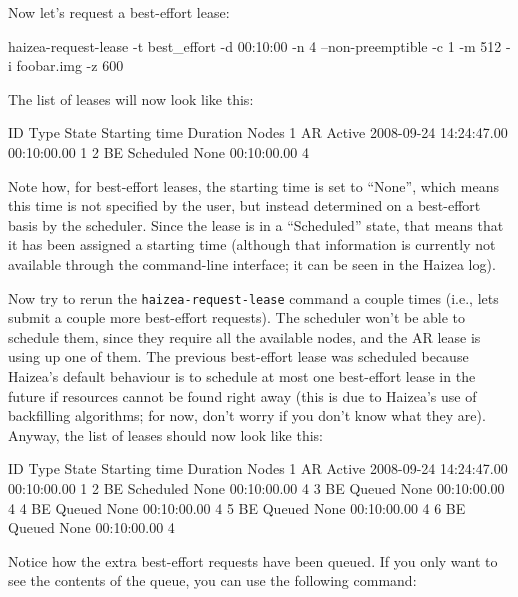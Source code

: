 Now let's request a best-effort lease:

\begin{wideshellverbatim}
haizea-request-lease -t best_effort -d 00:10:00 -n 4 --non-preemptible -c 1 -m 512 -i foobar.img -z 600
\end{wideshellverbatim}

The list of leases will now look like this:

\begin{wideshellverbatim}
 ID   Type  State      Starting time           Duration      Nodes  
 1    AR    Active     2008-09-24 14:24:47.00  00:10:00.00   1       
 2    BE    Scheduled  None                    00:10:00.00   4       
\end{wideshellverbatim}

Note how, for best-effort leases, the starting time is set to ``None'', which means this time is not specified by the user, but instead determined on a best-effort basis by the scheduler. Since the lease is in a ``Scheduled'' state, that means that it has been assigned a starting time (although that information is currently not available through the command-line interface; it can be seen in the Haizea log).

Now try to rerun the \texttt{haizea-request-lease} command a couple times (i.e., lets submit a couple more best-effort requests). The scheduler won't be able to schedule them, since they require all the available nodes, and the AR lease is using up one of them. The previous best-effort lease was scheduled because Haizea's default behaviour is to schedule at most one best-effort lease in the future if resources cannot be found right away (this is due to Haizea's use of backfilling algorithms; for now, don't worry if you don't know what they are). Anyway, the list of leases should now look like this:

\begin{wideshellverbatim}
 ID   Type  State      Starting time           Duration      Nodes  
 1    AR    Active     2008-09-24 14:24:47.00  00:10:00.00   1       
 2    BE    Scheduled  None                    00:10:00.00   4       
 3    BE    Queued     None                    00:10:00.00   4       
 4    BE    Queued     None                    00:10:00.00   4       
 5    BE    Queued     None                    00:10:00.00   4       
 6    BE    Queued     None                    00:10:00.00   4       
\end{wideshellverbatim}

Notice how the extra best-effort requests have been queued. If you only want to see the contents of the queue, you can use the following command:

